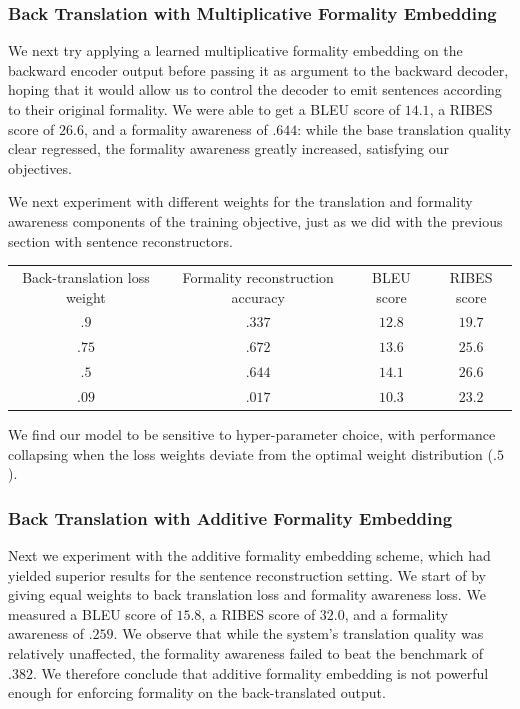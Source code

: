 \documentclass[11pt]{article}
\begin{document}
\subsubsection{Back Translation with Multiplicative Formality Embedding}

We next try applying a learned multiplicative formality embedding on the backward encoder output before passing it as argument to the backward decoder, hoping that it would allow us to control the decoder to emit sentences according to their original formality. We were able to get a BLEU score of $14.1$, a RIBES score of $26.6$, and a formality awareness of $.644$: while the base translation quality clear regressed, the formality awareness greatly increased, satisfying our objectives.

We next experiment with different weights for the translation and formality awareness components of the training objective, just as we did with the previous section with sentence reconstructors.

\begin{tabular}{ c c c c }
    Back-translation loss weight & Formality reconstruction accuracy & BLEU score & RIBES score \\
    $.9$ & $.337$ & $12.8$ & $19.7$ \\
    $.75$ & $.672$ & $13.6$ & $25.6$ \\
    $.5$ & $.644$ & $14.1$ & $26.6$ \\
    $.09$ & $.017$ & $10.3$ & $23.2$ \\
\end{tabular}

We find our model to be sensitive to hyper-parameter choice, with performance collapsing when the loss weights deviate from the optimal weight distribution ($.5$). 

\subsubsection{Back Translation with Additive Formality Embedding}

Next we experiment with the additive formality embedding scheme, which had yielded superior results for the sentence reconstruction setting. We start of by giving equal weights to back translation loss and formality awareness loss. We measured a BLEU score of $15.8$, a RIBES score of $32.0$, and a formality awareness of $.259$. We observe that while the system's translation quality was relatively unaffected, the formality awareness failed to beat the benchmark of $.382$. We therefore conclude that additive formality embedding is not powerful enough for enforcing formality on the back-translated output.
\end{document}

